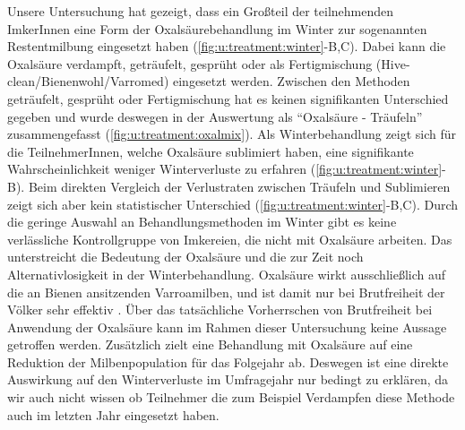 
Unsere Untersuchung hat gezeigt, dass ein Großteil der teilnehmenden ImkerInnen eine Form der Oxalsäurebehandlung im Winter zur sogenannten Restentmilbung eingesetzt haben (\cref{fig:u:treatment:winter}-B,C). Dabei kann die Oxalsäure verdampft, geträufelt, gesprüht oder als Fertigmischung (Hive-clean/Bienenwohl/Varromed) eingesetzt werden. Zwischen den Methoden geträufelt, gesprüht oder Fertigmischung hat es keinen signifikanten Unterschied gegeben und wurde deswegen in der Auswertung als \enquote{Oxalsäure - Träufeln} zusammengefasst (\cref{fig:u:treatment:oxalmix}).
\newline
Als Winterbehandlung zeigt sich für die TeilnehmerInnen, welche Oxalsäure sublimiert haben, eine signifikante Wahrscheinlichkeit weniger Winterverluste zu erfahren (\cref{fig:u:treatment:winter}-B). Beim direkten Vergleich der Verlustraten zwischen Träufeln und Sublimieren zeigt sich aber kein statistischer Unterschied (\cref{fig:u:treatment:winter}-B,C).
\newline
Durch die geringe Auswahl an Behandlungsmethoden im Winter gibt es keine verlässliche Kontrollgruppe von Imkereien, die nicht mit Oxalsäure arbeiten. Das unterstreicht die Bedeutung der Oxalsäure und die zur Zeit noch Alternativlosigkeit in der Winterbehandlung. Oxalsäure wirkt ausschließlich auf die an Bienen ansitzenden Varroamilben, und ist damit nur bei Brutfreiheit der Völker sehr effektiv \citep{rosenkranz2010}. Über das tatsächliche Vorherrschen von Brutfreiheit bei Anwendung der Oxalsäure kann im Rahmen dieser Untersuchung keine Aussage getroffen werden. Zusätzlich zielt eine Behandlung mit Oxalsäure auf eine Reduktion der Milbenpopulation für das Folgejahr ab. Deswegen ist eine direkte Auswirkung auf den Winterverluste im Umfragejahr nur bedingt zu erklären, da wir auch nicht wissen ob Teilnehmer die zum Beispiel Verdampfen diese Methode auch im letzten Jahr eingesetzt haben.


